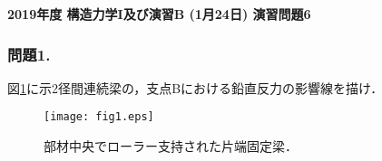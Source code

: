 \documentclass[10pt,a4j]{jarticle}
\newlength{\minitwocolumn}
\begin{document}
\newcommand{\fat}[1]{\mbox{\boldmath $#1$}}
\newcommand{\D}{\partial}
\newcommand{\w}{\omega}
\newcommand{\ga}{\alpha}
\newcommand{\gb}{\beta}
\newcommand{\gx}{\xi}
\newcommand{\gz}{\zeta}
\newcommand{\vhat}[1]{\hat{\fat{#1}}}
\newcommand{\spc}{\vspace{0.7\baselineskip}}
\newcommand{\halfspc}{\vspace{0.3\baselineskip}}

\pagestyle{empty}
\newcommand{\twofig}[2]
 {
   \begin{figure}[h]
     \begin{minipage}[t]{\minitwocolumn}
         \begin{center}   #1
         \end{center}
     \end{minipage}
         \hspace{\columnsep}
     \begin{minipage}[t]{\minitwocolumn}
         \begin{center} #2
         \end{center}
     \end{minipage}
   \end{figure}
 }
\begin{center}
{\Large \bf 2019年度 構造力学I及び演習B (1月24日) 演習問題6} \\
\end{center}
\subsubsection*{問題1.}
図\ref{fig:fig1}に示2径間連続梁の，支点Bにおける鉛直反力の影響線を描け．
\begin{figure}[h]
	\begin{center}
	\texttt{[image: fig1.eps]} 
	\end{center}
	\caption{部材中央でローラー支持された片端固定梁．} 
	\label{fig:fig1}
\end{figure}
%
\end{document}
